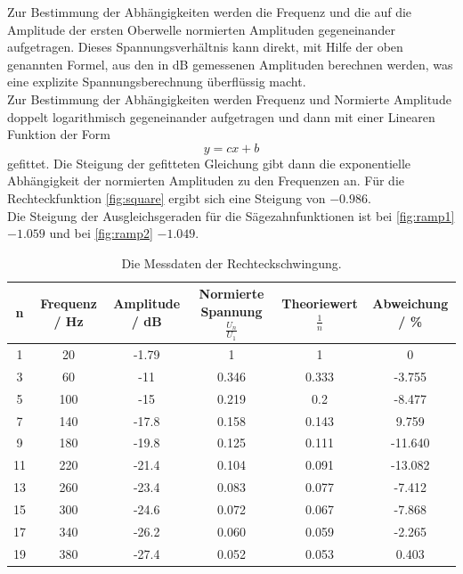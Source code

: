 Zur Bestimmung der Abhängigkeiten werden die Frequenz und die auf die Amplitude der ersten Oberwelle
normierten Amplituden gegeneinander aufgetragen.
Dieses Spannungsverhältnis kann direkt, mit Hilfe der oben genannten Formel, aus den in dB gemessenen Amplituden berechnen werden, was eine explizite Spannungsberechnung überflüssig macht.\\
Zur Bestimmung der Abhängigkeiten werden Frequenz und Normierte Amplitude doppelt logarithmisch gegeneinander aufgetragen
und dann mit einer Linearen Funktion der Form
\[
  y=cx+b
\]
gefittet. Die Steigung der gefitteten Gleichung gibt dann die exponentielle Abhängigkeit der normierten Amplituden zu den Frequenzen an.
Für die Rechteckfunktion \autoref{fig:square} ergibt sich eine Steigung von $−0.986$.\\
Die Steigung der Ausgleichsgeraden für die Sägezahnfunktionen ist bei \autoref{fig:ramp1} $-1.059$ und bei \autoref{fig:ramp2} $-1.049$.
\begin{table}[H]
  \begin{center}
    \begin{tabular}{ |c|c|c|c|c|c| }
      \hline
      n  & Frequenz / Hz & Amplitude / dB & Normierte Spannung $\frac{U_n}{U_1}$ & Theoriewert $\frac{1}{n}$ & Abweichung / \% \\
      \hline
      1  & 20            & -1.79          & 1                                    & 1                         & 0               \\
      3  & 60            & -11            & 0.346                                & 0.333                     & -3.755          \\
      5  & 100           & -15            & 0.219                                & 0.2                       & -8.477          \\
      7  & 140           & -17.8          & 0.158                                & 0.143                     & 9.759           \\
      9  & 180           & -19.8          & 0.125                                & 0.111                     & -11.640         \\
      11 & 220           & -21.4          & 0.104                                & 0.091                     & -13.082         \\
      13 & 260           & -23.4          & 0.083                                & 0.077                     & -7.412          \\
      15 & 300           & -24.6          & 0.072                                & 0.067                     & -7.868          \\
      17 & 340           & -26.2          & 0.060                                & 0.059                     & -2.265          \\
      19 & 380           & -27.4          & 0.052                                & 0.053                     & 0.403           \\
      \hline
    \end{tabular}
    \caption{\label{rechteck-table} Die Messdaten der Rechteckschwingung.}
  \end{center}
\end{table}
